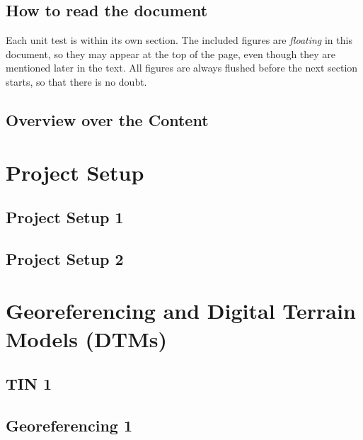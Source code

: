 \documentclass{scrartcl}
\begin{document}
\subsection{How to read the document}

Each unit test is within its own section.
The included figures are \emph{floating} in this document, so they may appear at the top of the page,
 even though they are mentioned later in the text.
All figures are always flushed before the next section starts, so that there is no doubt.

\subsection{Overview over the Content}
\renewcommand\contentsname{}
\tableofcontents
\clearpage

\section{Project Setup}

\subsection{Project Setup 1}
\label{sec:project_setup_1}
\clearpage

\subsection{Project Setup 2}
\label{sec:project_setup_2}
\clearpage

\section{Georeferencing and Digital Terrain Models (DTMs)}

\subsection{TIN 1}
\label{sec:tin_1}
\clearpage

\subsection{Georeferencing 1}
\label{sec:georeferencing_1}
\clearpage
\end{document}
